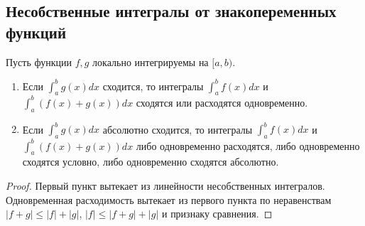 \subsection{Несобственные интегралы от знакопеременных функций}

\begin{lemma}
    Пусть функции $f, g$ локально интегрируемы на $[a, b)$.
    \begin{enumerate}
        \item Если $\int_{a}^{b} g(x) dx$ сходится, то интегралы $\int_{a}^{b} f(x) dx$ и $\int_{a}^{b} (f(x) + g(x)) dx$ сходятся или расходятся одновременно.
        \item Если $\int_{a}^{b} g(x) dx$ абсолютно сходится, то интегралы $\int_{a}^{b} f(x) dx$ и $\int_{a}^{b} (f(x) + g(x)) dx$ либо одновременно расходятся, либо одновременно сходятся условно, либо одновременно сходятся абсолютно.
    \end{enumerate}
\end{lemma}

\begin{proof}
    Первый пункт вытекает из линейности несобственных интегралов. Одновременная расходимость вытекает из первого пункта по неравенствам $|f + g| \leq |f| + |g|$, $|f| \leq |f + g| + |g|$ и признаку сравнения.
\end{proof}